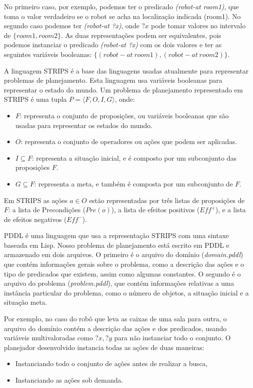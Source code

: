 \documentclass[12pt,a4paper]{article}
\begin{document}
No primeiro caso, por exemplo, podemos ter o predicado \textit{(robot-at room1)}, que toma o valor verdadeiro se o robot se acha na localização indicada (room1).
No segundo caso podemos ter \textit{(robot-at ?x)}, onde $?x$ pode tomar valores no intervalo de $\{ room1, room2 \}$.
As duas representações podem ser equivalentes, pois podemos instanciar o predicado \textit{(robot-at ?x)} com os dois valores e ter as seguintes variáveis booleanas: $\{ (robot-at~room1), (robot-at~room2) \}$.

A linguagem STRIPS é a base das linguagens usadas atualmente para representar problemas de planejamento.
Esta linguagem usa variáveis booleanas para representar o estado do mundo.
Um problema de planejamento representado em STRIPS é uma tupla $P=\langle F,O,I,G \rangle$, onde:

\begin{itemize}
\item $F$: representa o conjunto de proposições, ou variáveis booleanas que são usadas para representar os estados do mundo.
\item $O$: representa o conjunto de operadores ou ações que podem ser aplicadas.
\item $I\subseteq F$: representa a situação inicial, e é composto por um subconjunto das proposições $F$.
\item $G \subseteq F$: representa a meta, e também é composta por um subconjunto de $F$.
\end{itemize}

Em STRIPS as ações $a \in O$ estão representadas por três listas de proposições de $F$: a lista de Precondições ($Pre(o)$), a lista de efeitos positivos ($Eff^+$), e a lista de efeitos negativos ($Eff^-$).

PDDL é uma linguagem que usa a representação STRIPS com uma sintaxe baseada em Lisp. 
Nosso problema de planejamento está escrito em PDDL e armazenado em dois arquivos. O primeiro é o arquivo do domínio (\textit{domain.pddl}) que contém informações gerais sobre o problema, como a descrição das ações e o tipo de predicados que existem, assim como algumas constantes. O segundo é o arquivo do problema (\textit{problem.pddl}), que contém informações relativas a uma instância particular do problema, como o número de objetos, a situação inicial e a situação meta.

Por exemplo, no caso do robô que leva as caixas de uma sala para outra, o arquivo do domínio contém a descrição das ações e dos predicados, usando variáveis multivaloradas como $?x, ?y$ para não instanciar todo o conjunto. 
O planejador desenvolvido instancia todas as ações de duas maneiras:
\begin{itemize}
\item Instanciando todo o conjunto de ações antes de realizar a busca,
\item Instanciando as ações sob demanda.
\end{itemize}
\end{document}
